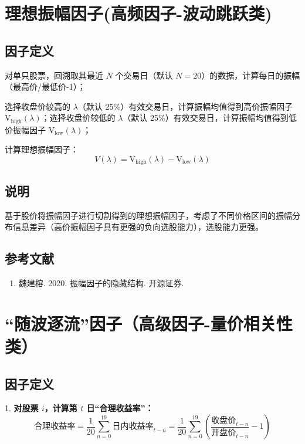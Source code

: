 \documentclass{article}
\begin{document}
\section{理想振幅因子(高频因子-波动跳跃类)}

\subsection{因子定义}


对单只股票，回溯取其最近 \(N\) 个交易日（默认 \(N=20\)）的数据，计算每日的振幅（最高价/最低价-1）；

选择收盘价较高的 \(\lambda\)（默认 25\%）有效交易日，计算振幅均值得到高价振幅因子 \(\mathrm{V}_{\mathrm{high}}(\lambda)\)；选择收盘价较低的 \(\lambda\)（默认 25\%）有效交易日，计算振幅均值得到低价振幅因子 \(\mathrm{V}_{\mathrm{low}}(\lambda)\)；

计算理想振幅因子：
\begin{equation}
    V(\lambda) = \mathrm{V}_{\mathrm{high}}(\lambda) - \mathrm{V}_{\mathrm{low}}(\lambda)
\end{equation}

\subsection{说明}
基于股价将振幅因子进行切割得到的理想振幅因子，考虑了不同价格区间的振幅分布信息差异（高价振幅因子具有更强的负向选股能力），选股能力更强。

\subsection{参考文献}
\begin{enumerate}
    \item 魏建榕. 2020. 振幅因子的隐藏结构. 开源证券.
\end{enumerate}

\section{“随波逐流”因子（高级因子-量价相关性类）}

\subsection{因子定义}

1. \textbf{对股票 \(i\)，计算第 \(t\) 日“合理收益率”：}
   \begin{equation}
       \text{合理收益率} = \frac{1}{20} \sum_{n=0}^{19} \text{日内收益率}_{t-n} = \frac{1}{20} \sum_{n=0}^{19} \left( \frac{\text{收盘价}_{t-n}}{\text{开盘价}_{t-n}} - 1 \right)
   \end{equation}
\end{document}
